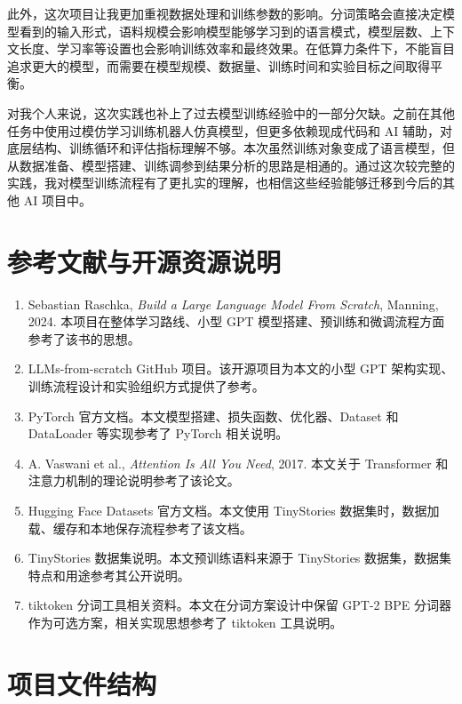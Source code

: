 \documentclass[UTF8,a4paper,zihao=-4,fontset=none]{ctexart}
\numberwithin{equation}{section}
\begin{document}
此外，这次项目让我更加重视数据处理和训练参数的影响。分词策略会直接决定模型看到的输入形式，语料规模会影响模型能够学习到的语言模式，模型层数、上下文长度、学习率等设置也会影响训练效率和最终效果。在低算力条件下，不能盲目追求更大的模型，而需要在模型规模、数据量、训练时间和实验目标之间取得平衡。

对我个人来说，这次实践也补上了过去模型训练经验中的一部分欠缺。之前在其他任务中使用过模仿学习训练机器人仿真模型，但更多依赖现成代码和 AI 辅助，对底层结构、训练循环和评估指标理解不够。本次虽然训练对象变成了语言模型，但从数据准备、模型搭建、训练调参到结果分析的思路是相通的。通过这次较完整的实践，我对模型训练流程有了更扎实的理解，也相信这些经验能够迁移到今后的其他 AI 项目中。

\section*{参考文献与开源资源说明}

\begin{enumerate}
  \item Sebastian Raschka, \textit{Build a Large Language Model From Scratch}, Manning, 2024. 本项目在整体学习路线、小型 GPT 模型搭建、预训练和微调流程方面参考了该书的思想。
  \item LLMs-from-scratch GitHub 项目。该开源项目为本文的小型 GPT 架构实现、训练流程设计和实验组织方式提供了参考。
  \item PyTorch 官方文档。本文模型搭建、损失函数、优化器、Dataset 和 DataLoader 等实现参考了 PyTorch 相关说明。
  \item A. Vaswani et al., \textit{Attention Is All You Need}, 2017. 本文关于 Transformer 和注意力机制的理论说明参考了该论文。
  \item Hugging Face Datasets 官方文档。本文使用 TinyStories 数据集时，数据加载、缓存和本地保存流程参考了该文档。
  \item TinyStories 数据集说明。本文预训练语料来源于 TinyStories 数据集，数据集特点和用途参考其公开说明。
  \item tiktoken 分词工具相关资料。本文在分词方案设计中保留 GPT-2 BPE 分词器作为可选方案，相关实现思想参考了 tiktoken 工具说明。
\end{enumerate}

\appendix

\section{项目文件结构}
\end{document}
